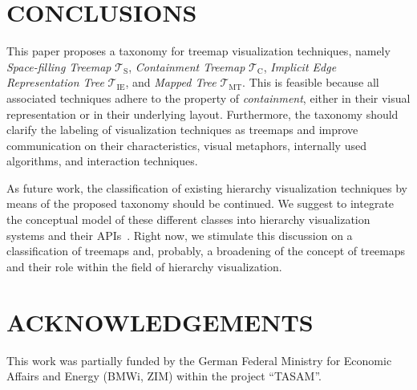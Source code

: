 \documentclass[a4paper,twoside]{article}
\newcommand*\Ts {$\mathcal{T}_{\mathrm{S}}$}
\newcommand*\Tc {$\mathcal{T}_{\mathrm{C}}$}
\newcommand*\Tie{$\mathcal{T}_{\mathrm{IE}}$}
\newcommand*\Tmt{$\mathcal{T}_{\mathrm{MT}}$}
\begin{document}
\section{\uppercase{Conclusions}}
\label{sec:conclusions}
\noindent
This paper proposes a taxonomy for treemap visualization techniques, namely \emph{Space-filling Treemap} \Ts, \emph{Containment Treemap} \Tc, \emph{Implicit Edge Representation Tree} \Tie, and \emph{Mapped Tree} \Tmt.
This is feasible because all associated techniques adhere to the property of \emph{containment}, either in their visual representation or in their underlying layout.
Furthermore, the taxonomy should clarify the labeling of visualization techniques as treemaps and improve communication on their characteristics, visual metaphors, internally used algorithms, and interaction techniques.
\par
As future work, the classification of existing hierarchy visualization techniques by means of the proposed taxonomy should be continued.
We suggest to integrate the conceptual model of these different classes into hierarchy visualization systems and their APIs~\cite{scheibel2019-hiviser}.
Right now, we stimulate this discussion on a classification of treemaps and, probably, a broadening of the concept of treemaps and their role within the field of hierarchy visualization.

\section*{\uppercase{Acknowledgements}}
\noindent%
This work was partially funded by %
the German Federal Ministry for Economic Affairs and Energy (BMWi, ZIM) within the project \enquote{{TASAM}}.


{
\small

}
\end{document}
